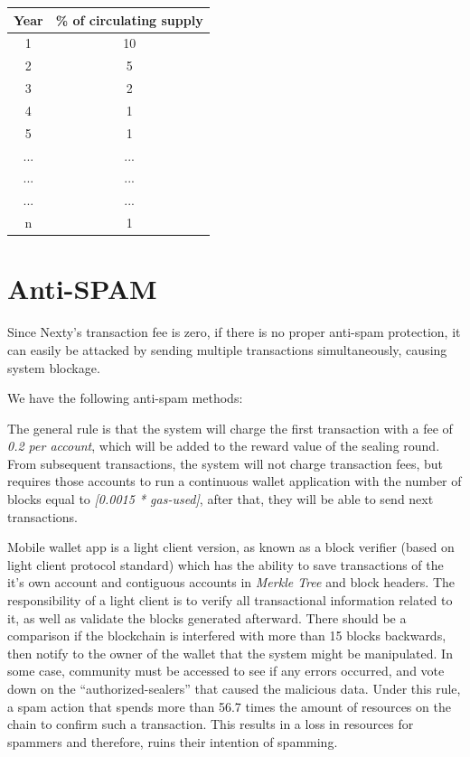 \documentclass[12pt,oneside]{amsart}
\begin{document}
\begin{multicols}{2}
\begin{center}
  \begin{tabular}{@{} cc @{}}
    \hline
    Year &  \% of circulating supply \\ 
    \hline
    1 & 10 \\ 
    2 & 5 \\ 
    3 & 2 \\ 
    4 & 1 \\ 
    5 & 1 \\     
    ... & ... \\ 
    ... & ... \\ 
    ... & ... \\ 
    n &  1 \\
    \hline
  \end{tabular}
\end{center}

\section{Anti-SPAM}\label{sec:spam}

Since Nexty's transaction fee is zero, if there is no proper anti-spam protection, it can easily be attacked by sending multiple transactions simultaneously, causing system blockage.

We have the following anti-spam methods:

The general rule is that the system will charge the first transaction with a fee of \textit{0.2 per account}, which will be added to the reward value of the sealing round. From subsequent transactions, the system will not charge transaction fees, but requires those accounts to run a continuous wallet application with the number of blocks equal to \textit{[0.0015 * gas-used]}, after that, they will be able to send next transactions.

Mobile wallet app is a light client version, as known as a block verifier (based on light client protocol standard) which has the ability to save transactions of the it's own account and contiguous accounts in \textit{Merkle Tree} and block headers. The responsibility of a light client is to verify all transactional information related to it, as well as validate the blocks generated afterward. There should be a comparison if the blockchain is interfered with more than 15 blocks backwards, then notify to the owner of the wallet that the system might be manipulated. In some case, community must be accessed to see if any errors occurred, and vote down on the ``authorized-sealers'' that caused the malicious data. Under this rule, a spam action that spends more than 56.7 times the amount of resources on the chain to confirm such a transaction. This results in a loss in resources for spammers and therefore, ruins their intention of spamming.


\end{multicols}
\end{document}
